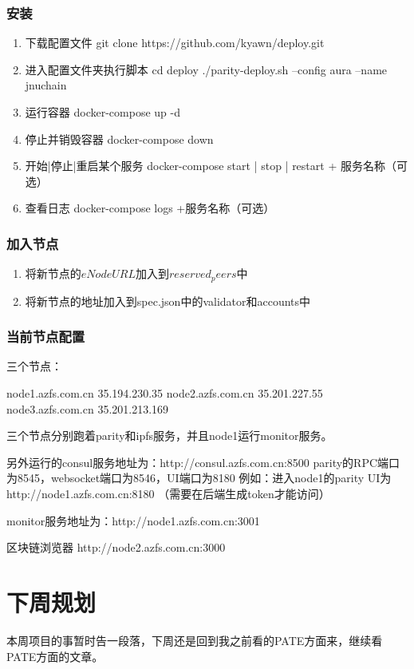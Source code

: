 \documentclass[a4paper]{article}
\begin{document}
\subsubsection*{安装}
\begin{enumerate}
\item 下载配置文件 
git clone https://github.com/kyawn/deploy.git

\item 进入配置文件夹执行脚本 
cd deploy 
./parity-deploy.sh --config aura --name jnuchain

\item 运行容器 
docker-compose up -d

\item 停止并销毁容器 
docker-compose down

\item 开始|停止|重启某个服务 
docker-compose start | stop | restart + 服务名称（可选）

\item 查看日志 
docker-compose logs +服务名称（可选）
\end{enumerate}

\subsubsection*{加入节点}
\begin{enumerate}
\item 将新节点的$eNodeURL$加入到$reserved_peers$中

\item 将新节点的地址加入到spec.json中的validator和accounts中
\end{enumerate}

\subsubsection*{当前节点配置}
三个节点： 

node1.azfs.com.cn 35.194.230.35 
node2.azfs.com.cn 35.201.227.55
node3.azfs.com.cn 35.201.213.169

三个节点分别跑着parity和ipfs服务，并且node1运行monitor服务。

另外运行的consul服务地址为：http://consul.azfs.com.cn:8500
parity的RPC端口为8545，websocket端口为8546，UI端口为8180
例如：进入node1的parity UI为http://node1.azfs.com.cn:8180 （需要在后端生成token才能访问）

monitor服务地址为：http://node1.azfs.com.cn:3001

区块链浏览器 http://node2.azfs.com.cn:3000

\section{下周规划}
本周项目的事暂时告一段落，下周还是回到我之前看的PATE方面来，继续看PATE方面的文章。
\end{document}
